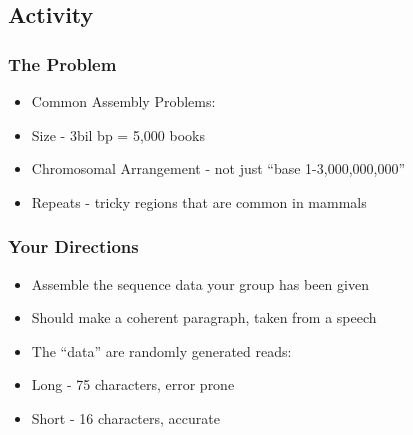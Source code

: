 \documentclass[14pt,handout]{beamer}
\begin{document}



\subsection{Activity}
\begin{frame}
\frametitle{The Problem}
\begin{itemize}
	\item<+-> Common Assembly Problems:
	\item<+-> Size - 3bil bp = 5,000 books
	\item<+-> Chromosomal Arrangement - not just ``base 1-3,000,000,000''
	\item<+-> Repeats - tricky regions that are common in mammals
\end{itemize}
\end{frame}

\begin{frame}
\frametitle{Your Directions}
\begin{itemize}
	\item<+-> Assemble the sequence data your group has been given
	\item<+-> Should make a coherent paragraph, taken from a speech
	\item<+-> The ``data'' are randomly generated reads:
	\item<+-> Long - 75 characters, error prone
	\item<+-> Short - 16 characters, accurate 
\end{itemize}
\end{frame}
\end{document}
